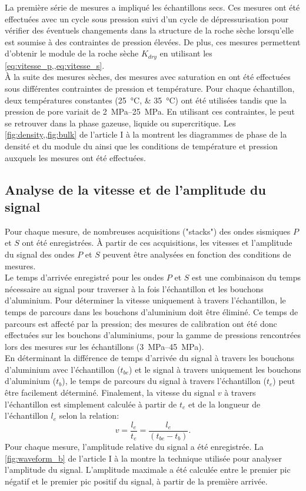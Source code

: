 La première série de mesures a impliqué les échantillons secs. Ces mesures ont
été effectuées avec un cycle sous pression suivi d'un cycle de dépressurisation
pour vérifier des éventuels changements dans la structure de la roche sèche
lorsqu'elle est soumise à des contraintes de pression élevées. De plus, ces
mesures permettent d'obtenir le module de la roche sèche $K_{dry}$ en utilisant
les \cref{eq:vitesse_p,,eq:vitesse_s}.\\
À la suite des mesures sèches, des mesures avec saturation en  ont été
effectuées sous différentes contraintes de pression et température. Pour chaque
échantillon, deux températures constantes (\SIlist{25;35}{\degreeCelsius}) ont
été utilisées tandis que la pression de pore variait de
\SIrange{2}{25}{\mega\pascal}.
En utilisant ces contraintes, le  peut se retrouver dans la phase
gazeuse, liquide ou supercritique. Les \cref{fig:density,,fig:bulk} de l'article
I à la  montrent les diagrammes de phase de la densité
et du module du  ainsi que les conditions de température et pression
auxquels les mesures ont été effectuées.
\subsection{Analyse de la vitesse et de l’amplitude du signal}
Pour chaque mesure, de nombreuses acquisitions ("stacks") des ondes sismiques
$P$ et $S$ ont été enregistrées. À partir de ces acquisitions, les vitesses et
l’amplitude du signal des ondes $P$ et $S$ peuvent être analysées en fonction des
conditions de mesures.\\
Le temps d'arrivée enregistré pour les ondes $P$ et $S$ est une combinaison du
temps nécessaire au signal pour traverser à la fois l’échantillon et les
bouchons d’aluminium. Pour déterminer la vitesse uniquement à travers
l’échantillon, le temps de parcours dans les bouchons d’aluminium doit être
éliminé. Ce temps de parcours est affecté par la pression; des mesures de
calibration ont été donc effectuées sur les bouchons d’aluminiums, pour la gamme
de pressions rencontrées lors des mesures sur les échantillons
(\SIrange{3}{45}{\mega\pascal}).\\
En déterminant la différence de temps d’arrivée du signal à travers les bouchons
d’aluminium avec l’échantillon ($t_{be}$) et le signal à travers uniquement les
bouchons d’aluminium ($t_b$), le temps de parcours du signal à travers
l’échantillon ($t_e$) peut être facilement déterminé. Finalement, la vitesse du
signal $v$ à travers l’échantillon est simplement calculée à partir de $t_e$ et
de la longueur de l’échantillon $l_e$ selon la relation:
\begin{equation}
v = \frac{l_e}{t_e} = \frac{l_e}{(t_{be}-t_b)}.
\end{equation}
Pour chaque mesure, l'amplitude relative du signal a été enregistrée. La
\cref{fig:waveform_b} de l'article I à la  montre la
technique utilisée pour analyser l'amplitude du signal. L'amplitude maximale a
été calculée entre le premier pic négatif et le premier pic positif du signal, à
partir de la première arrivée.
